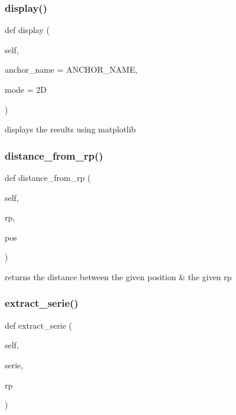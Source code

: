 \subsubsection{\texorpdfstring{display()}{display()}}
{\footnotesize\ttfamily def display (\begin{DoxyParamCaption}\item[{}]{self,  }\item[{}]{anchor\+\_\+name = {\ttfamily ANCHOR\+\_\+NAME},  }\item[{}]{mode = {\ttfamily \textquotesingle{}2D\textquotesingle{}} }\end{DoxyParamCaption})}

\begin{DoxyVerb}displays the results using matplotlib\end{DoxyVerb}
 \mbox{\label{classread_mes_1_1_measurements_ae9f85ff6eeb7be193c52d772e6aeacfb}} 
\subsubsection{\texorpdfstring{distance\+\_\+from\+\_\+rp()}{distance\_from\_rp()}}
{\footnotesize\ttfamily def distance\+\_\+from\+\_\+rp (\begin{DoxyParamCaption}\item[{}]{self,  }\item[{}]{rp,  }\item[{}]{pos }\end{DoxyParamCaption})}

\begin{DoxyVerb}returns the distance between the given position & the given rp\end{DoxyVerb}
 \mbox{\label{classread_mes_1_1_measurements_ac792c51cc2fd3ee12f7fe6d4595c853b}} 
\subsubsection{\texorpdfstring{extract\+\_\+serie()}{extract\_serie()}}
{\footnotesize\ttfamily def extract\+\_\+serie (\begin{DoxyParamCaption}\item[{}]{self,  }\item[{}]{serie,  }\item[{}]{rp }\end{DoxyParamCaption})}

